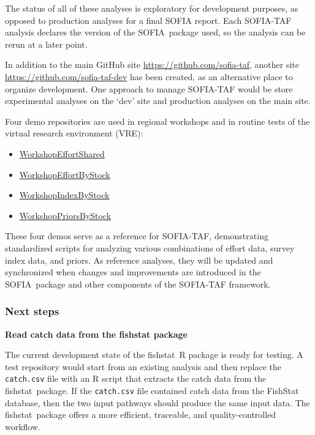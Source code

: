 \documentclass[12pt]{article}
\newcommand\blue[1]{\textcolor{darkblue}{#1}}
\newcommand\fishstat{{\sf fishstat}}
\newcommand\SOFIA{{\sf SOFIA}}
\newcommand\sofialink[2]{\blue{\href{https://github.com/sofia-taf/#1}{\sf #2}}}
\begin{document}
The status of all of these analyses is exploratory for development purposes, as
opposed to production analyses for a final SOFIA report. Each SOFIA-TAF analysis
declares the version of the \SOFIA\ package used, so the analysis can be rerun
at a later point.

In addition to the main GitHub site \blue{\url{https://github.com/sofia-taf}},
another site \blue{\url{https://github.com/sofia-taf-dev}} has been created, as
an alternative place to organize development. One approach to manage SOFIA-TAF
would be store experimental analyses on the `dev' site and production analyses
on the main site.

Four demo repositories are used in regional workshops and in routine tests of
the virtual research environment (VRE):

\begin{itemize}
  \item \sofialink{WorkshopEffortShared}{WorkshopEffortShared}
  \item \sofialink{WorkshopEffortByStock}{WorkshopEffortByStock}
  \item \sofialink{WorkshopIndexByStock}{WorkshopIndexByStock}
  \item \sofialink{WorkshopPriorsByStock}{WorkshopPriorsByStock}
\end{itemize}

These four demos serve as a reference for SOFIA-TAF, demonstrating standardized
scripts for analyzing various combinations of effort data, survey index data,
and priors. As reference analyses, they will be updated and synchronized when
changes and improvements are introduced in the \SOFIA\ package and other
components of the SOFIA-TAF framework.

\subsubsection{Next steps}
\label{subsubsec:repos-next-steps}

\textbf{Read catch data from the fishstat package}

The current development state of the \fishstat\ R package is ready for testing.
A test repository would start from an existing analysis and then replace the
\verb|catch.csv| file with an R script that extracts the catch data from the
\fishstat\ package. If the \verb|catch.csv| file contained catch data from the
FishStat database, then the two input pathways should produce the same input
data. The \fishstat\ package offers a more efficient, traceable, and
quality-controlled workflow.\\[-2ex]
\end{document}
